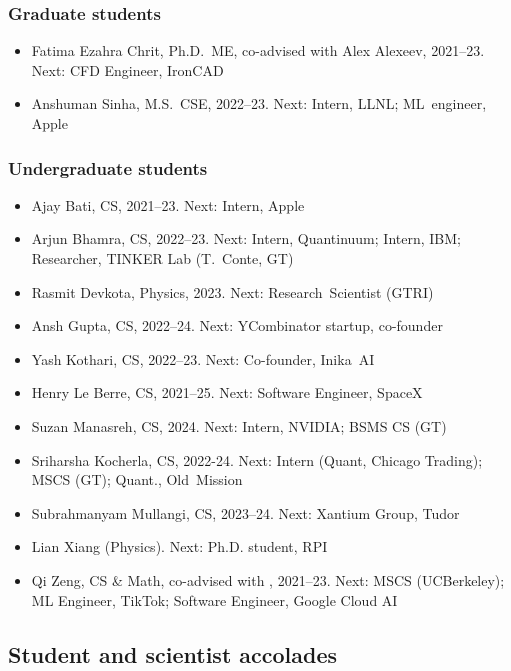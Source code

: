 \subsubsection{Graduate students}

\begin{itemize}
    \item Fatima Ezahra Chrit, Ph.D.\ ME, co-advised with Alex Alexeev, 2021--23. Next: CFD Engineer, IronCAD
    \item Anshuman Sinha, M.S.\ CSE, 2022--23. Next: Intern, LLNL; ML~engineer, Apple
\end{itemize}

\subsubsection{Undergraduate students}

\begin{itemize}
    \item Ajay Bati, CS, 2021--23. Next: Intern, Apple
    \item Arjun Bhamra, CS, 2022--23. Next: Intern, Quantinuum; Intern, IBM; Researcher, TINKER Lab (T.~Conte, GT)
    \item Rasmit Devkota, Physics, 2023. Next: Research~Scientist (GTRI)
    \item Ansh Gupta, CS, 2022--24. Next: YCombinator startup, co-founder
    \item Yash Kothari, CS, 2022--23. Next: Co-founder, Inika~AI
    \item Henry Le Berre, CS, 2021--25. Next: Software Engineer, SpaceX
    \item Suzan Manasreh, CS, 2024. Next: Intern, NVIDIA; BSMS CS (GT)
    \item Sriharsha Kocherla, CS, 2022-24. Next: Intern (Quant, Chicago Trading); MSCS (GT); Quant., Old~Mission
    \item Subrahmanyam Mullangi, CS, 2023--24. Next: Xantium Group, Tudor
    \item Lian Xiang (Physics). Next: Ph.D. student, RPI
    \item Qi Zeng, CS \& Math, co-advised with \Florian, 2021--23. Next: MSCS (UCBerkeley); ML Engineer, TikTok; Software Engineer, Google Cloud AI
\end{itemize}

\subsection{Student and scientist accolades}

